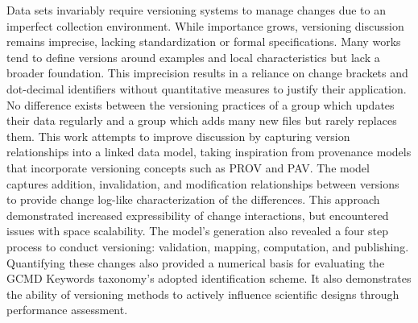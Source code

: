 

Data sets invariably require versioning systems to manage changes due to an imperfect collection environment.
While importance grows, versioning discussion remains imprecise, lacking standardization or formal specifications.
Many works tend to define versions around examples and local characteristics but lack a broader foundation.
This imprecision results in a reliance on change brackets and dot-decimal identifiers without quantitative measures to justify their application.
No difference exists between the versioning practices of a group which updates their data regularly and a group which adds many new files but rarely replaces them.
This work attempts to improve discussion by capturing version relationships into a linked data model, taking inspiration from provenance models that incorporate versioning concepts such as PROV and PAV.
The model captures addition, invalidation, and modification relationships between versions to provide change log-like characterization of the differences.
This approach demonstrated increased expressibility of change interactions, but encountered issues with space scalability.
The model's generation also revealed a four step process to conduct versioning: validation, mapping, computation, and publishing.
Quantifying these changes also provided a numerical basis for evaluating the GCMD Keywords taxonomy's adopted identification scheme.
It also demonstrates the ability of versioning methods to actively influence scientific designs through performance assessment.